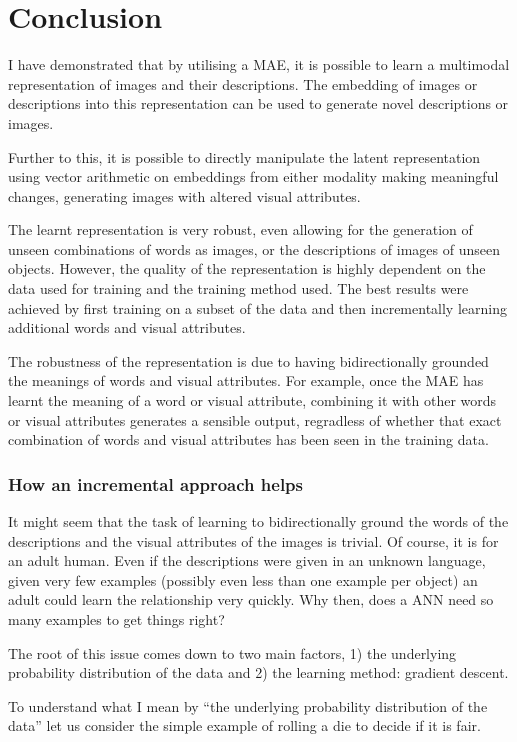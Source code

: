 \section{Conclusion}
I have demonstrated that by utilising a \ac{MAE}, it is possible to learn a multimodal representation of images and their descriptions. The embedding of images or descriptions into this representation can be used to generate novel descriptions or images.

Further to this, it is possible to directly manipulate the latent representation using vector arithmetic on embeddings from either modality making meaningful changes, generating images with altered visual attributes.

The learnt representation is very robust, even allowing for the generation of unseen combinations of words as images, or the descriptions of images of unseen objects. However, the quality of the representation is highly dependent on the data used for training and the training method used. The best results were achieved by first training on a subset of the data and then incrementally learning additional words and visual attributes.

The robustness of the representation is due to having bidirectionally grounded the meanings of words and visual attributes. For example, once the \ac{MAE} has learnt the meaning of a word or visual attribute, combining it with other words or visual attributes generates a sensible output, regradless of whether that exact combination of words and visual attributes has been seen in the training data.

\subsubsection{How an incremental approach helps}
It might seem that the task of learning to bidirectionally ground the words of the descriptions and the visual attributes of the images is trivial. Of course, it is for an adult human. Even if the descriptions were given in an unknown language, given very few examples (possibly even less than one example per object) an adult could learn the relationship very quickly. Why then, does a \ac{ANN} need so many examples to get things right?

The root of this issue comes down to two main factors, 1) the underlying probability distribution of the data and 2) the learning method: gradient descent.

To understand what I mean by ``the underlying probability distribution of the data'' let us consider the simple example of rolling a die to decide if it is fair.

